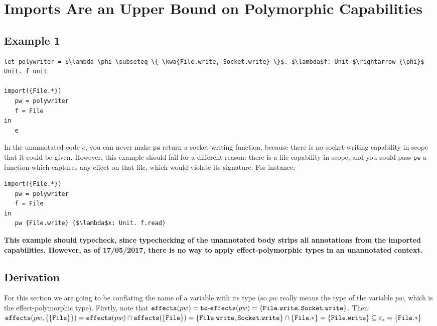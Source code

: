\documentclass{llncs}
\newcommand{\keywadj}[1]{\mathtt{#1}}
\newcommand{\kwa}[1]{\keywadj{ #1 }}
\newcommand{\hyphen}{\hbox{-}}
\newcommand{\fx}[1]{ \kwa{effects}(#1) }
\newcommand{\hofx}[1]{ \kwa{ho \hyphen effects}(#1) }
\begin{document}
\section{Imports Are an Upper Bound on Polymorphic Capabilities}

\subsection{Example 1}

\begin{lstlisting}
let polywriter = $\lambda \phi \subseteq \{ \kwa{File.write, Socket.write} \}$. $\lambda$f: Unit $\rightarrow_{\phi}$ Unit. f unit

import({File.*}) 
   pw = polywriter
   f = File
in
   e
\end{lstlisting}

\noindent
In the unannotated code $e$, you can never make $\kwa{pw}$ return a socket-writing function, because there is no socket-writing capability in scope that it could be given. However, this example should fail for a different reason: there is a file capability in scope, and you could pass $\kwa{pw}$ a function which captures any effect on that file, which would violate its signature. For instance:

\begin{lstlisting}
import({File.*}) 
   pw = polywriter
   f = File
in
   pw {File.write} ($\lambda$x: Unit. f.read)
\end{lstlisting}

\noindent
\textbf{This example should typecheck, since typechecking of the unannotated body strips all annotations from the imported capabilities. However, as of 17/05/2017, there is no way to apply effect-polymorphic types in an unannotated context.}\\

\subsection*{Derivation}

For this section we are going to be conflating the name of a variable with its type (so $pw$ really means the type of the variable $pw$, which is the effect-polymorphic type). Firstly, note that $\fx{pw} = \hofx{pw} = \{ \kwa{File.write, Socket.write} \}$. Then: \\

\noindent
 $\kwa{effects}(pw, \{ \{ \kwa{File} \} \})\\
=  \fx{pw} \cap \fx{\{\kwa{File}\}}\\
=  \{ \kwa{File.write, Socket.write} \} \cap \{ \kwa{File.*} \}\\
=  \{ \kwa{File.write} \} \subseteq \varepsilon_s = \{ \kwa{File.*} \}$\\
\end{document}
